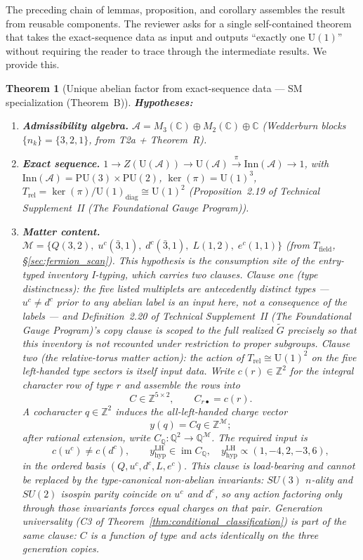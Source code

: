 \documentclass[11pt]{article}
\newtheorem{theorem}{Theorem}[section]
\theoremstyle{definition}
\newcommand{\U}{\mathrm{U}}
\newcommand{\TSII}{Technical Supplement~II (\emph{The Foundational Gauge Program})}
\begin{document}
The preceding chain of lemmas, proposition, and corollary assembles the
result from reusable components.  The reviewer asks for a single
self-contained theorem that takes the exact-sequence data as input and
outputs ``exactly one $\U(1)$'' without requiring the reader to trace
through the intermediate results.  We provide this.

\begin{theorem}[Unique abelian factor from exact-sequence data ---
SM specialization (Theorem~B)]%
\label{thm:unique_U1_consolidated}
\textbf{Hypotheses:}
\begin{enumerate}[label=(H\arabic*),nosep]
  \item \textbf{Admissibility algebra.}\quad
  $\mathcal{A} = M_3(\mathbb{C}) \oplus M_2(\mathbb{C}) \oplus
  \mathbb{C}$ (Wedderburn blocks $\{n_k\} = \{3, 2, 1\}$, from
  T2a + Theorem~R).
  \item \textbf{Exact sequence.}\quad
  $1 \to Z(\mathrm{U}(\mathcal{A})) \to \mathrm{U}(\mathcal{A})
  \xrightarrow{\pi} \mathrm{Inn}(\mathcal{A}) \to 1$, with
  $\mathrm{Inn}(\mathcal{A}) = \mathrm{PU}(3) \times \mathrm{PU}(2)$,
  $\ker(\pi) = \mathrm{U}(1)^3$,
  $T_{\mathrm{rel}} = \ker(\pi) / \mathrm{U}(1)_{\mathrm{diag}}
  \cong \mathrm{U}(1)^2$
  (Proposition~2.19 of \TSII{}).
  \item \textbf{Matter content.}\quad
  $\mathcal{M} = \{Q(3,2),\; u^c(\bar{3},1),\; d^c(\bar{3},1),\;
  L(1,2),\; e^c(1,1)\}$ (from $T_{\mathrm{field}}$,
  \S\ref{sec:fermion_scan}).  This hypothesis is the consumption site
  of the entry-typed inventory I-typing, which carries two clauses.
  \emph{Clause one (type distinctness):} the five listed multiplets
  are \emph{antecedently} distinct types --- $u^c \ne d^c$ prior to
  any abelian label is an input here, not a consequence of the labels
  --- and Definition~2.20 of \TSII{}'s copy clause is
  scoped to the full realized $\widetilde{G}$ precisely so that this
  inventory is not recounted under restriction to proper subgroups.
  \emph{Clause two (the relative-torus matter action):} the action of
  $T_{\mathrm{rel}}\cong\U(1)^2$ on the five left-handed type
  sectors is itself input data.  Write
  $c(r)\in\mathbb Z^2$ for the integral character row of type $r$ and
  assemble the rows into
  \[
    C\in\mathbb Z^{5\times2},\qquad
    C_{r\bullet}=c(r).
  \]
  A cocharacter $q\in\mathbb Z^2$ induces the all-left-handed charge
  vector
  \[
    y(q)=Cq\in\mathbb Z^{\mathcal M};
  \]
  after rational extension, write
  $C_{\mathbb Q}:\mathbb Q^2\to\mathbb Q^{\mathcal M}$.  The required
  input is
  \[
    c(u^c)\ne c(d^c),\qquad
    y_{\mathrm{hyp}}^{\mathrm{LH}}
    \in\operatorname{im}C_{\mathbb Q},
    \quad
    y_{\mathrm{hyp}}^{\mathrm{LH}}
    \propto(1,-4,2,-3,6),
  \]
  in the ordered basis $(Q,u^c,d^c,L,e^c)$.  This clause is
  load-bearing and cannot be replaced by the type-canonical
  non-abelian invariants: $SU(3)$ $n$-ality and $SU(2)$ isospin parity
  coincide on $u^c$ and $d^c$, so any action factoring only through
  those invariants forces equal charges on that pair.  Generation
  universality (C3 of Theorem~\ref{thm:conditional_classification}) is
  part of the same clause: $C$ is a function of type and acts
  identically on the three generation copies.


\end{enumerate}
\end{theorem}
\end{document}
